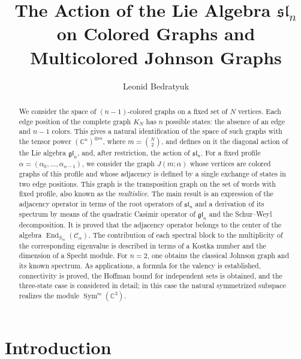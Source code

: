 \documentclass[12pt,reqno]{amsart}
\newcommand{\End}{\operatorname{End}}
\newcommand{\Sym}{\operatorname{Sym}}
\begin{document}
\title{The Action of the Lie Algebra $\mathfrak{sl}_n$ on Colored Graphs and Multicolored Johnson Graphs}
\author{Leonid Bedratyuk}
\address{ Khmelnytsky National University, Faculty of Information Technology, Ukraine}

\begin{abstract}
We consider the space of $(n-1)$-colored graphs on a fixed set of
$N$ vertices. Each edge position of the complete graph $K_N$ has $n$
possible states: the absence of an edge and $n-1$ colors. This gives a
natural identification of the space of such graphs with the tensor power
$(\mathbb C^n)^{\otimes m}$, where $m=\binom N2$, and defines on it the
diagonal action of the Lie algebra $\mathfrak{gl}_n$, and, after
restriction, the action of $\mathfrak{sl}_n$.
For a fixed profile
$\alpha=(\alpha_0,\dots,\alpha_{n-1})$, we consider the graph
$J(m;\alpha)$ whose vertices are colored graphs of this profile and whose
adjacency is defined by a single exchange of states in two edge positions.
This graph is the transposition graph on the set of words with fixed
profile, also known as the \emph{multislice}.
The main result is an expression of the adjacency operator in terms of
the root operators of $\mathfrak{sl}_n$ and a derivation of its spectrum
by means of the quadratic Casimir operator of $\mathfrak{gl}_n$ and the
Schur--Weyl decomposition. It is proved that the adjacency operator belongs
to the center of the algebra $\End_{S_m}(\mathcal C_\alpha)$. The
contribution of each spectral block to the multiplicity of the
corresponding eigenvalue is described in terms of a Kostka number and the
dimension of a Specht module.
For $n=2$, one obtains the classical Johnson graph and its known spectrum.
As applications, a formula for the valency is established, connectivity is
proved, the Hoffman bound for independent sets is obtained, and the
three-state case is considered in detail; in this case the natural
symmetrized subspace realizes the module $\Sym^m(\mathbb C^3)$.
\end{abstract}




\maketitle

\section{Introduction}
\end{document}
